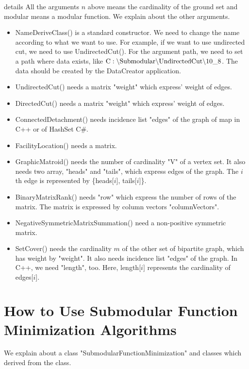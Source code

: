 \documentclass{article}
\begin{document}
\mbox{}

{\sf details}
All the arguments $n$ above means the cardinality of the ground set
and modular means a modular function.
We explain about the other arguments.
\begin{itemize}
\item NameDeriveClass() is a standard constructor.
We need to change the name according to what we want to use.
For example, if we want to use undirected cut, we need to use UndirectedCut().
For the argument path, we need to set a path where data exists,
like ${\rm C:\backslash Submodular\backslash UndirectedCut\backslash 10\_ 8}$.
The data should be created by the DataCreator application.
\item UndirectedCut() needs a matrix "weight" which express' weight of edges.
\item DirectedCut() needs a matrix "weight" which express' weight of edges.
\item ConnectedDetachment() needs incidence list "edges" of the graph of map in C++ or of HashSet C\#.
\item FacilityLocation() needs a matrix.
\item GraphicMatroid() needs the number of cardinality "V" of a vertex set.
It also needs two array, "heads" and "tails", which express edges of the graph.
The $i$th edge is represented by \{heads[$i$], tails[$i$]\}.
\item BinaryMatrixRank() needs "row" which express the number of rows of the matrix.
The matrix is expressed by column vectors "columnVectors".
\item NegativeSymmetricMatrixSummation() need a non-positive symmetric matrix.
\item SetCover() needs the cardinality $m$ of the other set of bipartite graph,
which has weight by "weight".
It also needs incidence list "edges" of the graph.
In C++, we need "length", too.
Here, length[$i]$ represents the cardinality of edges[$i$].
\end{itemize}


\newpage
\section{How to Use Submodular Function Minimization Algorithms}
We explain about a class "SubmodularFunctionMinimization" and classes which derived from the class.
\end{document}

